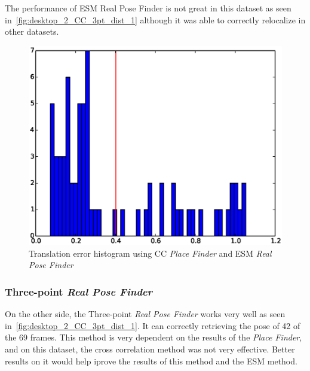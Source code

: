 The performance of ESM Real Pose Finder is not great in this dataset as seen in~\ref{fig:desktop_2_CC_3pt_dist_1} although it was able to correctly relocalize in other datasets.\\

\begin{figure}[htpb]
  \includegraphics[width=1\linewidth]{img/large_desktop/CC_esm_dist.eps}
  \caption{Translation error histogram using CC \textit{Place Finder} and ESM \textit{Real Pose Finder}}
  \label{fig:desktop_2_CC_esm_dist_1}
\end{figure}


\subsubsection{Three-point \textit{Real Pose Finder}}
\label{ssub:large_three_point_real_pose_finder}

On the other side, the Three-point \textit{Real Pose Finder} works very well as seen in~\ref{fig:desktop_2_CC_3pt_dist_1}. It can correctly retrieving the pose of 42 of the 69 frames. This method is very dependent on the results of the \textit{Place Finder}, and on this dataset, the cross correlation method was not very effective. Better results on it would help iprove the results of this method and the ESM method.\\

